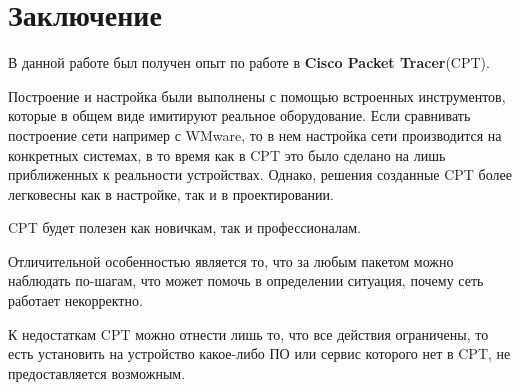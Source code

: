 \documentclass[14pt,a4paper,report]{report}
\begin{document}
\section{Заключение}
В данной работе был получен опыт по работе в \textbf{Cisco Packet Tracer}(CPT).


Построение и настройка были выполнены с помощью встроенных инструментов, которые в общем виде имитируют реальное оборудование. Если сравнивать построение сети например с WMware, то в нем настройка сети производится на конкретных системах, в то время как в CPT это было сделано на лишь приближенных к реальности устройствах. Однако, решения созданные CPT более легковесны как в настройке, так и в проектировании.

CPT будет полезен как новичкам, так и профессионалам.

Отличительной особенностью является то, что за любым пакетом можно наблюдать по-шагам, что может помочь в определении ситуация, почему сеть работает некорректно.

К недостаткам CPT можно отнести лишь то, что все действия ограничены, то есть установить на устройство какое-либо ПО или сервис которого нет в CPT, не предоставляется возможным.
\end{document}
